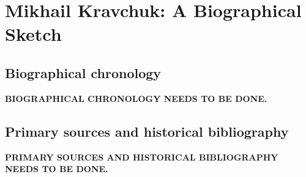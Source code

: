 \chapter{Mikhail Kravchuk: A Biographical Sketch}
\section{Biographical chronology}

\noindent\textbf{BIOGRAPHICAL CHRONOLOGY NEEDS TO BE DONE.}


\section{Primary sources and historical bibliography}

\noindent\textbf{PRIMARY SOURCES AND HISTORICAL BIBLIOGRAPHY NEEDS TO BE DONE.}


